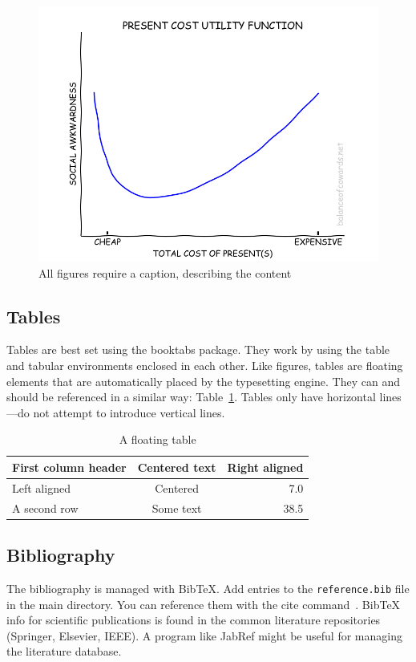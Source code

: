 \begin{figure}
	\centering
	\includegraphics[width=.8\linewidth]{presents.png}
	\caption{All figures require a caption, describing the content}\label{fig:myfig}
\end{figure}

\subsection{Tables}

Tables are best set using the booktabs package. They work by using the
table and tabular environments enclosed in each other.
Like figures, tables are floating elements that are automatically placed
by the typesetting engine. They can and should be referenced in a similar
way: Table~\ref{tab:mytable}. Tables only have horizontal lines---do not
attempt to introduce vertical lines.

\begin{table}[b]
	\centering %
\begin{tabular}{lcr} %
	\toprule
	First column header & Centered text & Right aligned \\
	\midrule
	Left aligned	& Centered &	7.0 \\
	A second row	& Some text &	38.5 \\
	\bottomrule
\end{tabular}
\caption{A floating table}%
\label{tab:mytable}
\end{table}

\subsection{Bibliography}

The bibliography is managed with BibTeX. Add entries to the \verb'reference.bib'
file in the main directory. You can reference them with the cite command~\cite{someref}.
BibTeX info for scientific publications is found in the common literature repositories
(Springer, Elsevier, IEEE). A program like JabRef might be useful for managing the
literature database.


